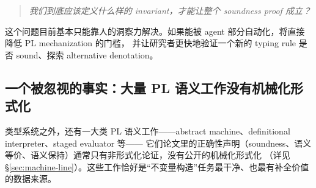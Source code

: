 \begin{quote}
\emph{我们到底应该定义什么样的 invariant，才能让整个 soundness proof 成立？}
\end{quote}

这个问题目前基本只能靠人的洞察力解决。如果能被 agent 部分自动化，将直接降低 PL mechanization 的门槛，
并让研究者更快地验证一个新的 typing rule 是否 sound、探索 alternative denotation。

\subsection{一个被忽视的事实：大量 PL 语义工作没有机械化形式化}

类型系统之外，还有一大类 PL 语义工作——abstract machine、definitional interpreter、staged evaluator 等——
它们论文里的正确性声明（soundness、语义等价、语义保持）通常只有非形式化论证，没有公开的机械化形式化
（详见 \S\ref{sec:machine-line}）。这些工作恰好是``不变量构造''任务最干净、也最有补全价值的数据来源。

